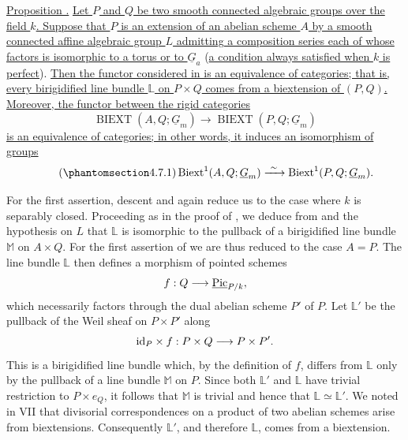 
\medskip
\noindent\underline{Proposition .}  \underline{Let $P$ and $Q$
be two smooth connected algebraic groups over the field $k$.
Suppose that $P$ is an extension of an abelian scheme $A$ by a smooth
connected affine algebraic group $L$ admitting a composition series
each of whose factors is isomorphic to a torus or to $\underline
G_a$} (\underline{a condition always satisfied when $k$ is perfect}).  \underline{Then the
functor considered in  is an equivalence of categories; that is,
every birigidified line bundle $\mathbb L$ on $P\times Q$ comes from
a biextension of $(P,Q)$.  Moreover, the functor between the rigid
categories}
\[
 \operatorname{BIEXT}(A,Q;\underline G_m)
 \longrightarrow
 \operatorname{BIEXT}(P,Q;\underline G_m)
\]
\underline{is an equivalence of categories; in other words, it
induces an isomorphism of groups}
\begin{equation}\tag{\SGARefTarget{sga7.sga7i.eviii.n4-7-1}{4.7.1}}
 \Biext^1(A,Q;\underline G_m)
 \xrightarrow{\ \sim\ }
 \Biext^1(P,Q;\underline G_m).
\end{equation}

For the first assertion, descent and  again reduce us to the case
where $k$ is separably closed.  Proceeding as in the proof of ,
we deduce from  and the hypothesis on $L$ that $\mathbb L$ is
isomorphic to the pullback of a birigidified line bundle $\mathbb M$
on $A\times Q$.  For the first assertion of  we are thus reduced
to the case $A=P$.  The line bundle $\mathbb L$ then defines a
morphism of pointed schemes
\[
 f:Q\longrightarrow\underline{\Pic}_{P/k},
\]
which necessarily factors through the dual abelian scheme $P'$ of
$P$.  Let $\mathbb L'$ be the pullback of the Weil sheaf on
$P\times P'$ along
\[
 \mathrm{id}_P\times f:P\times Q\longrightarrow P\times P'.
\]
This is a birigidified line bundle which, by the definition of $f$,
differs from $\mathbb L$ only by the pullback of a line bundle
$\mathbb M$ on $P$.  Since both $\mathbb L'$ and $\mathbb L$ have
trivial restriction to $P\times e_Q$, it follows that $\mathbb M$ is
trivial and hence that $\mathbb L\simeq\mathbb L'$.  We noted in VII
 that divisorial correspondences on a product of two abelian
schemes arise from biextensions.  Consequently $\mathbb L'$, and
therefore $\mathbb L$, comes from a biextension.

